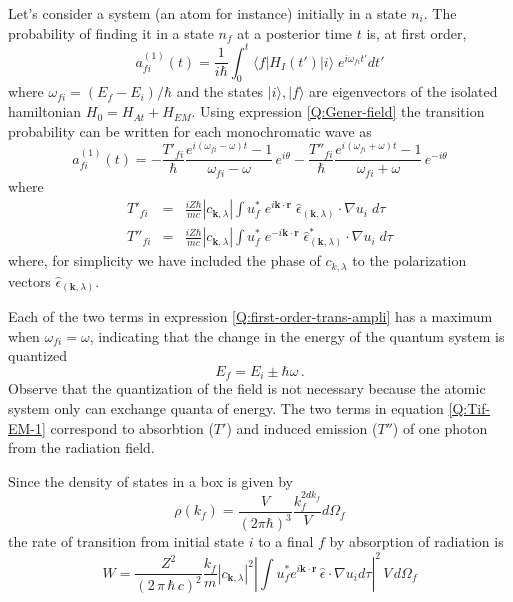 Let's consider a system (an atom for instance) initially in a state $n_{i}$. The probability of finding it in a state $n_{f}$ at a posterior time $t$ is, at first order,
\begin{equation}\label{Q:first-order-trans-ampli}
a_{fi}^{(1)}(t) = \frac{1}{i \hbar} \int_{0}^{t} \langle
f|H_{I}(t')| i \rangle \; e^{i \omega_{fi} t'} d t'
\end{equation}
where $\omega_{fi} = (E_{f}-E_{i})/\hbar$ and the states $| i\rangle, | f\rangle$ are eigenvectors of the isolated hamiltonian $H_{0} = H_{At} + H_{EM}$. Using expression \ref{Q:Gener-field} the transition probability can be written for each monochromatic wave as
\begin{equation}\label{Q:first-order-trans-ampli-1}
a_{fi}^{(1)}(t) = - \frac{T'_{fi}}{\hbar} \frac{e^{i (\omega_{fi}-\omega)t} -1}{\omega_{fi} - \omega} \, e^{i \theta}
- \frac{T''_{fi}}{\hbar} \frac{e^{i (\omega_{fi} + \omega)t} -1}{\omega_{fi} + \omega} \, e^{- i \theta}
\end{equation}
%
where
\begin{eqnarray} \label{Q:Tif-EM-1}
T'_{fi} &=& \frac{i Z \hbar}{m c} |c_{\bm{k},\lambda}| \int u^{*}_{f} \; e^{i \bm{k} \cdot \bm{r}} \;
\hat{\epsilon}_{(\bm{k},\lambda)}  \cdot \nabla u_{i} \; d \tau
\\
T''_{fi} &=& \frac{i Z \hbar}{m c} |c_{\bm{k},\lambda}| \int u^{*}_{f} \; e^{- i \bm{k} \cdot \bm{r}} \;
\hat{\epsilon}_{(\bm{k},\lambda)}^{*} \cdot \nabla u_{i} \; d \tau
\end{eqnarray}
where, for simplicity we have included the phase of $c_{k,\lambda}$ to the polarization vectors $\hat{\epsilon}_{(\bm{k},\lambda)}$.

Each of the two terms in expression \ref{Q:first-order-trans-ampli} has a maximum when $\omega_{fi} = \omega $, indicating that the change in the energy of the quantum system is quantized
%
\[ E_{f} = E_{i} \pm \hbar \omega \,. \]
%
Observe that the quantization of the field is not necessary because the atomic system only can exchange quanta of energy. The two terms in equation \ref{Q:Tif-EM-1} correspond to absorbtion ($T'$) and induced emission ($T''$) of one photon from the radiation field.

Since the density of states in a box is given by
\begin{equation}\label{Q:Densi-state}
\rho ( k_{f}) = \frac{V}{(2 \pi \hbar)^{3}}\frac{k_{f}^{2 d
k_{f}}}{V} d \Omega_{f}
\end{equation}
%
the rate of transition from initial state $i$ to a final $f$ by absorption of radiation is
\begin{equation}\label{Q:Trans-Rate}
W = \frac{Z^{2}}{(2\, \pi \, \hbar \, c)^{2}} \frac{k_{f}}{m}
|c_{\bm{k}, \lambda}|^{2}
  \left|\int
u_{f}^{*} e^{i \bm{k} \cdot \bm{r}} \, \hat{\epsilon} \cdot
\nabla u_{i} d \tau \right|^{2} \, V \,d \Omega_{f}
\end{equation}

